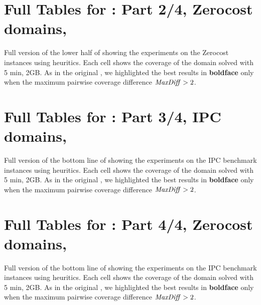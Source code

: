 \documentclass[10pt,letterpaper]{article}
\begin{document}
\newpage
\section{Full Tables for  : Part 2/4, Zerocost domains, \lmcut}

\begin{table}[htb]
 {
 \centering
 
 \caption{
 Full version of the lower half of  showing 
 the experiments on the Zerocost instances using \lmcut heuritics.
 Each cell shows the coverage of the domain solved with 5 min, 2GB.
 As in the original , we highlighted the best results in
 \textbf{boldface} only when the maximum pairwise coverage difference $\mit{MaxDiff}>2$.
 }
 \label{lmcut-zerocost-full}
 }
\end{table}

\newpage
\section{Full Tables for  : Part 3/4, IPC domains, \mands}

\begin{table}[htb]
 {
 \centering
 
 \caption{
 Full version of the bottom line of  showing 
 the experiments on the IPC benchmark instances using \mands heuritics.
 Each cell shows the coverage of the domain solved with 5 min, 2GB.
 As in the original , we highlighted the best results in
 \textbf{boldface} only when the maximum pairwise coverage difference $\mit{MaxDiff}>2$.
 }
 \label{mands-ipc-full}
 }
\end{table}

\newpage
\section{Full Tables for  : Part 4/4, Zerocost domains, \mands}

\begin{table}[htb]
 {
 \centering
 
 \caption{
 Full version of the bottom line of  showing 
 the experiments on the IPC benchmark instances using \mands heuritics.
 Each cell shows the coverage of the domain solved with 5 min, 2GB.
 As in the original , we highlighted the best results in
 \textbf{boldface} only when the maximum pairwise coverage difference $\mit{MaxDiff}>2$.
 }
 \label{mands-zerocost-full}
 }
\end{table}
\end{document}
